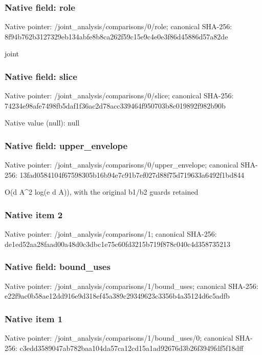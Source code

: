 \documentclass[10pt,a4paper]{article}
\begin{document}
\subsubsection{Native field: role}
Native pointer: /joint\_\allowbreak{}analysis/comparisons/0/role; canonical SHA-256: 8f94b762b3127329eb134abfe8b8ca262f59c15e9c4e0e3f86d45886d57a82de

\begingroup\raggedright\sloppy joint\par\endgroup

\subsubsection{Native field: slice}
Native pointer: /joint\_\allowbreak{}analysis/comparisons/0/slice; canonical SHA-256: 74234e98afe7498fb5daf1f36ac2d78acc339464f950703b8c019892f982b90b

Native value (null): null

\subsubsection{Native field: upper\_\allowbreak{}envelope}
Native pointer: /joint\_\allowbreak{}analysis/comparisons/0/upper\_\allowbreak{}envelope; canonical SHA-256: 13fad0584104f67598305b16b94e7c91b7ef027d88f75d719633a6492f1bd844

\begingroup\raggedright\sloppy O(d A\textasciicircum{}2 log(e d A)),\allowbreak{} with the original b1/\allowbreak{}b2 guards retained\par\endgroup

\subsubsection{Native item 2}
Native pointer: /joint\_\allowbreak{}analysis/comparisons/1; canonical SHA-256: de1ed52aa28faad00a48d0c3dbc1e75c60fd3215b719f878c040c4d358735213

\subsubsection{Native field: bound\_\allowbreak{}uses}
Native pointer: /joint\_\allowbreak{}analysis/comparisons/1/bound\_\allowbreak{}uses; canonical SHA-256: e22f9ac0b58ae12dd916e9d318ef45a389c29349623c3356b4a35124d6c5adfb

\subsubsection{Native item 1}
Native pointer: /joint\_\allowbreak{}analysis/comparisons/1/bound\_\allowbreak{}uses/0; canonical SHA-256: c3edd3589047ab782baa104da57ca12cd15a1ad92676d3b26f3949fdf5f18dff
\end{document}
